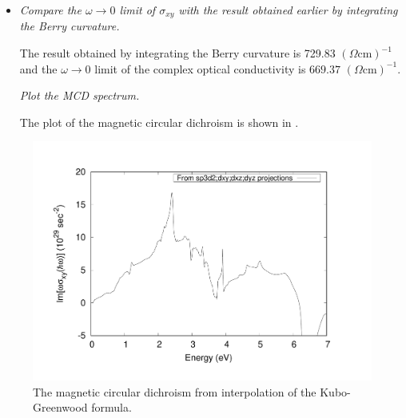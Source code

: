 \begin{itemize}
	\item {\it Compare the $\omega \rightarrow 0$ limit of $\sigma_{xy}$ with the result obtained earlier by integrating the Berry curvature.}

	The result obtained by integrating the Berry curvature is 729.83 $(\Omega \mathrm{cm})^{-1}$ and the $\omega \rightarrow 0$ limit of the complex optical conductivity is $669.37$ $(\Omega \mathrm{cm})^{-1}$.

    {\it Plot the MCD spectrum.}

    The plot of the magnetic circular dichroism is shown in .
\end{itemize}

\begin{figure}[t!]
\centering
\includegraphics[width=0.7\columnwidth]{figure/example18/Fe_MCD_xy_125_sp3d2_projections.pdf}
\caption{The magnetic circular dichroism from interpolation of the Kubo-Greenwood formula.}
\label{fig18.5}
\end{figure}
\clearpage
